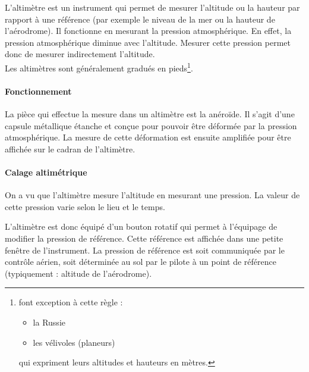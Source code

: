 	L'\gls{altimètre}  est un instrument qui permet de mesurer l'altitude ou la hauteur par rapport à une référence (par exemple le niveau de la mer ou la hauteur de l'aérodrome). Il fonctionne en mesurant la pression atmosphérique. En effet, la pression atmosphérique diminue avec l'altitude. Mesurer cette pression permet donc de mesurer indirectement l'altitude. \\
	
	Les altimètres sont généralement gradués en pieds\footnote{font exception à cette règle : \begin{itemize}
	\item la Russie
	\item les vélivoles (planeurs)
	\end{itemize} qui expriment leurs altitudes et hauteurs en mètres.}.
	
	\begin{figure}[H]	
	\centering
	\end{figure}
	
	\paragraph{Fonctionnement} La pièce qui effectue la mesure dans un altimètre est la \gls{anéroïde}. Il s'agit d'une capsule métallique étanche et conçue pour pouvoir être déformée par la pression atmosphérique. La mesure de cette déformation est ensuite amplifiée pour être affichée sur le cadran de l'altimètre.
	
	\paragraph{Calage altimétrique}
	On a vu que l'altimètre mesure l'altitude en mesurant une pression. La valeur de cette pression varie selon le lieu et le temps.
	
	L'altimètre est donc équipé d'un bouton rotatif qui permet à l'équipage de modifier la pression de référence. Cette référence est affichée dans une petite fenêtre de l'instrument. La pression de référence est soit communiquée par le contrôle aérien, soit déterminée au sol par le pilote à un point de référence (typiquement : altitude de l'aérodrome).
	
	
